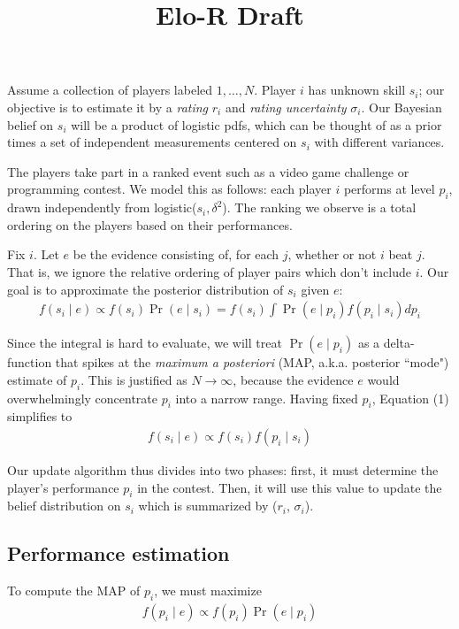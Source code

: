 \documentclass{article}
\title{Elo-R Draft}
\begin{document}
\maketitle

Assume a collection of players labeled $1,\ldots,N$. Player $i$ has unknown skill $s_i$; our objective is to estimate it by a \emph{rating} $r_i$ and \emph{rating uncertainty} $\sigma_i$. Our Bayesian belief on $s_i$ will be a product of logistic pdfs, which can be thought of as a prior times a set of independent measurements centered on $s_i$ with different variances.

The players take part in a ranked event such as a video game challenge or programming contest. We model this as follows: each player $i$ performs at level $p_i$, drawn independently from logistic($s_i, \delta^2$). The ranking we observe is a total ordering on the players based on their performances.

Fix $i$. Let $e$ be the evidence consisting of, for each $j$, whether or not $i$ beat $j$. That is, we ignore the relative ordering of player pairs which don't include $i$. Our goal is to approximate the posterior distribution of $s_i$ given $e$:
\begin{align}
f(s_i\mid e) \propto f(s_i)\Pr(e\mid s_i) = f(s_i)\int \Pr(e\mid p_i)f(p_i\mid s_i)dp_i
\end{align}

Since the integral is hard to evaluate, we will treat $\Pr(e\mid p_i)$ as a delta-function that spikes at the \emph{maximum a posteriori} (MAP, a.k.a. posterior ``mode") estimate of $p_i$. This is justified as $N \rightarrow \infty$, because the evidence $e$ would overwhelmingly concentrate $p_i$ into a narrow range. Having fixed $p_i$, Equation (1) simplifies to
\begin{align}
f(s_i\mid e) \propto f(s_i)f(p_i\mid s_i)
\end{align}

Our update algorithm thus divides into two phases: first, it must determine the player's performance $p_i$ in the contest. Then, it will use this value to update the belief distribution on $s_i$ which is summarized by ($r_i$, $\sigma_i$).

\subsection{Performance estimation}

To compute the MAP of $p_i$, we must maximize
\begin{align}
f(p_i\mid e) \propto f(p_i) \Pr(e\mid p_i)
\end{align}
\end{document}
